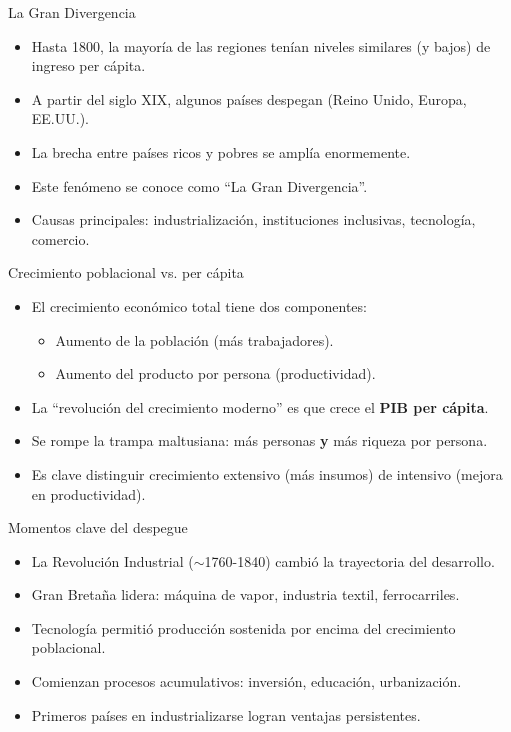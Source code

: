 \documentclass{beamer}
\begin{document}
\begin{frame}{La Gran Divergencia}
    \begin{itemize}
        \item Hasta 1800, la mayoría de las regiones tenían niveles similares (y bajos) de ingreso per cápita.
        \item A partir del siglo XIX, algunos países despegan (Reino Unido, Europa, EE.UU.).
        \item La brecha entre países ricos y pobres se amplía enormemente.
        \item Este fenómeno se conoce como “La Gran Divergencia”.
        \item Causas principales: industrialización, instituciones inclusivas, tecnología, comercio.
    \end{itemize}
\end{frame}

\begin{frame}{Crecimiento poblacional vs. per cápita}
    \begin{itemize}
        \item El crecimiento económico total tiene dos componentes:
        \begin{itemize}
            \item Aumento de la población (más trabajadores).
            \item Aumento del producto por persona (productividad).
        \end{itemize}
        \item La “revolución del crecimiento moderno” es que crece el \textbf{PIB per cápita}.
        \item Se rompe la trampa maltusiana: más personas \textbf{y} más riqueza por persona.
        \item Es clave distinguir crecimiento extensivo (más insumos) de intensivo (mejora en productividad).
    \end{itemize}
\end{frame}

\begin{frame}{Momentos clave del despegue}
    \begin{itemize}
        \item La Revolución Industrial ($\sim$1760-1840) cambió la trayectoria del desarrollo.
        \item Gran Bretaña lidera: máquina de vapor, industria textil, ferrocarriles.
        \item Tecnología permitió producción sostenida por encima del crecimiento poblacional.
        \item Comienzan procesos acumulativos: inversión, educación, urbanización.
        \item Primeros países en industrializarse logran ventajas persistentes.
    \end{itemize}
\end{frame}
\end{document}
